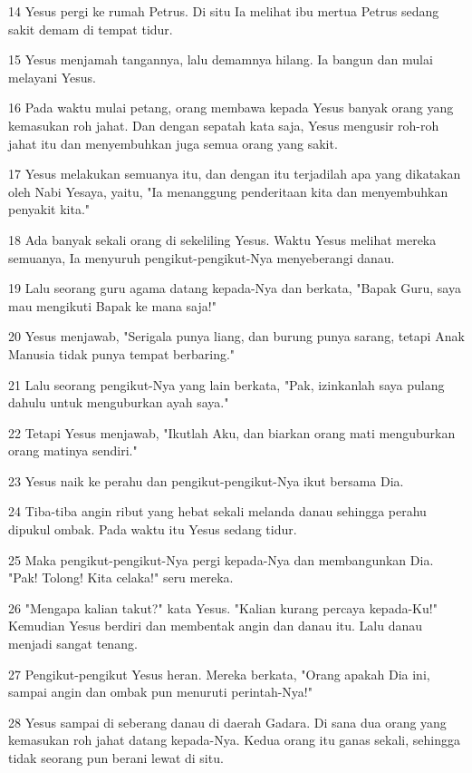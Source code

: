 \par 14 Yesus pergi ke rumah Petrus. Di situ Ia melihat ibu mertua Petrus sedang sakit demam di tempat tidur.
\par 15 Yesus menjamah tangannya, lalu demamnya hilang. Ia bangun dan mulai melayani Yesus.
\par 16 Pada waktu mulai petang, orang membawa kepada Yesus banyak orang yang kemasukan roh jahat. Dan dengan sepatah kata saja, Yesus mengusir roh-roh jahat itu dan menyembuhkan juga semua orang yang sakit.
\par 17 Yesus melakukan semuanya itu, dan dengan itu terjadilah apa yang dikatakan oleh Nabi Yesaya, yaitu, "Ia menanggung penderitaan kita dan menyembuhkan penyakit kita."
\par 18 Ada banyak sekali orang di sekeliling Yesus. Waktu Yesus melihat mereka semuanya, Ia menyuruh pengikut-pengikut-Nya menyeberangi danau.
\par 19 Lalu seorang guru agama datang kepada-Nya dan berkata, "Bapak Guru, saya mau mengikuti Bapak ke mana saja!"
\par 20 Yesus menjawab, "Serigala punya liang, dan burung punya sarang, tetapi Anak Manusia tidak punya tempat berbaring."
\par 21 Lalu seorang pengikut-Nya yang lain berkata, "Pak, izinkanlah saya pulang dahulu untuk menguburkan ayah saya."
\par 22 Tetapi Yesus menjawab, "Ikutlah Aku, dan biarkan orang mati menguburkan orang matinya sendiri."
\par 23 Yesus naik ke perahu dan pengikut-pengikut-Nya ikut bersama Dia.
\par 24 Tiba-tiba angin ribut yang hebat sekali melanda danau sehingga perahu dipukul ombak. Pada waktu itu Yesus sedang tidur.
\par 25 Maka pengikut-pengikut-Nya pergi kepada-Nya dan membangunkan Dia. "Pak! Tolong! Kita celaka!" seru mereka.
\par 26 "Mengapa kalian takut?" kata Yesus. "Kalian kurang percaya kepada-Ku!" Kemudian Yesus berdiri dan membentak angin dan danau itu. Lalu danau menjadi sangat tenang.
\par 27 Pengikut-pengikut Yesus heran. Mereka berkata, "Orang apakah Dia ini, sampai angin dan ombak pun menuruti perintah-Nya!"
\par 28 Yesus sampai di seberang danau di daerah Gadara. Di sana dua orang yang kemasukan roh jahat datang kepada-Nya. Kedua orang itu ganas sekali, sehingga tidak seorang pun berani lewat di situ.
